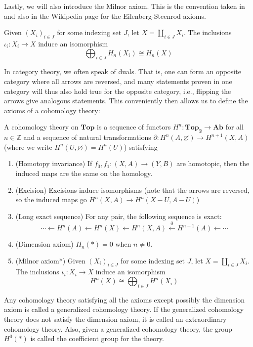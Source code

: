 \documentclass[12pt,reqno]{amsart}
\numberwithin{theorem}{section}
\theoremstyle{definition}
\theoremstyle{remark}
\numberwithin{equation}{section}
\newcommand{\Z}{\mathbb Z}
\newcommand{\del}{\partial}
\theoremstyle{definition}
\begin{document}
Lastly, we will also introduce the Milnor axiom. This is the convention taken in \cite{miller} and also in the Wikipedia page for the Eilenberg-Steenrod axioms.
\begin{definition}
    Given $(X_i)_{i \in J}$ for some indexing set $J$, let $X=\coprod_{i \in J} X_i$. The inclusions $\iota_i:X_i \rightarrow X$ induce an isomorphism
    $$\bigoplus_{i \in J}H_n(X_i)\cong H_n(X)$$
\end{definition}
In category theory, we often speak of duals. That is, one can form an opposite category where all arrows are reversed, and many statements proven in one category will thus also hold true for the opposite category, i.e., flipping the arrows give analogous statements. This conveniently then allows us to define the axioms of a cohomology theory:
\begin{definition}
    A cohomology theory on $\mathbf{Top}$ is a sequence of functors $H^n:\mathbf{Top_2}\rightarrow \mathbf{Ab}$ for all $n \in \Z$ and a sequence of natural transformations $\del : H^n(A,\varnothing)\rightarrow H^{n+1}(X,A)$ (where we write  $H^{n}(U,\varnothing) = H^n(U)$) satisfying
    \begin{enumerate}
        \item (Homotopy invariance) If $f_0,f_1:(X,A)\rightarrow (Y,B)$ are homotopic, then the induced maps are the same on the homology.
        \item (Excision) Excisions induce isomorphisms (note that the arrows are reversed, so the induced maps go $H^n(X,A)\rightarrow H^n(X-U,A-U)$)
        \item (Long exact sequence) For any pair, the following sequence is exact:
        $$\cdots \leftarrow H^n(A)\leftarrow H^n(X)\leftarrow H^n(X,A)\xleftarrow{\del} H^{n-1}(A)\leftarrow  \cdots $$
        \item (Dimension axiom) $H_n(*) = 0$ when $n\neq 0$. 
        \item (Milnor axiom*) Given $(X_i)_{i \in J}$ for some indexing set $J$, let $X=\coprod_{i \in J} X_i$. The inclusions $\iota_i:X_i \rightarrow X$ induce an isomorphism
    $$ H^n(X)\cong \bigoplus_{i \in J}H^n(X_i)$$
    \end{enumerate}
    Any cohomology theory satisfying all the axioms except possibly the dimension axiom is called a generalized cohomology theory. If the generalized cohomology theory does not satisfy the dimension axiom, it is called an extraordinary cohomology theory. Also, given a generalized cohomology theory, the group $H^0(*)$ is called the coefficient group for the theory.
\end{definition}
\end{document}
